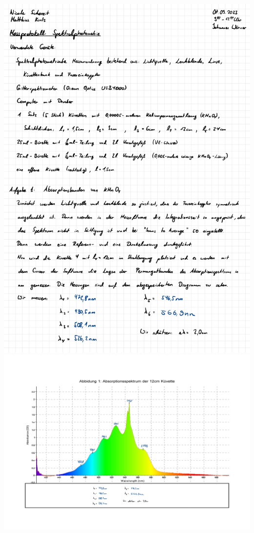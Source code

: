 \documentclass{article}
\begin{document}
\includegraphics[width=\textwidth]{graphics/mess1.jpg}
\newpage
\includegraphics[height=\textwidth, angle=90]{graphics/mess2.jpg}
\end{document}
